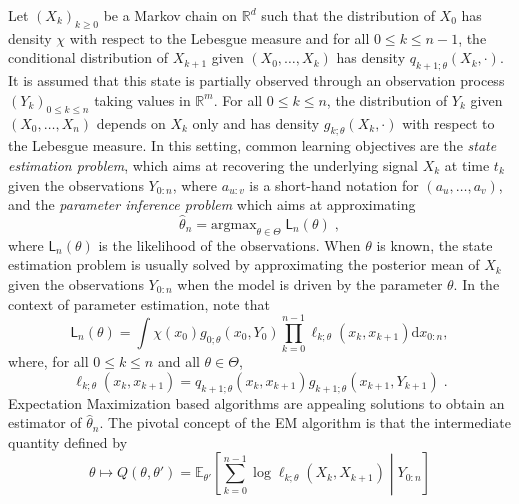 \documentclass{article}
\newcommand{\md}[1]{g_{#1}}
\newcommand{\llh}[1]{\mathsf{L}_{#1}}
\newcommand{\parvec}{\theta}
\newcommand{\parspace}{\Theta}
\newcommand{\hd}[1]{q_{#1}}
\def\pE{\mathbb{E}}
\newcommand{\rset}{\ensuremath{\mathbb{R}}}
\newcommand{\rmd}{\ensuremath{\mathrm{d}}}
\newcommand{\eqsp}{\;}
\newcommand{\qg}[1]{\ell_{#1}}
\newcommand{\sfd}{\mathsf{d}}
\begin{document}
%
Let $(X_k)_{k\geq 0}$ be a Markov chain on $\rset^d$ such that the distribution of $X_0$ has density $\chi$ with respect to the Lebesgue measure and for all $0\leqslant k \leqslant n-1$, the conditional distribution of $X_{k+1} $ given $(X_{0},\ldots, X_k)$ has density $\hd{k+1;\parvec}(X_{k},\cdot)$. 
It is assumed that this state  is partially observed  through an observation process $(Y_k)_{0\leqslant k \leqslant n}$ taking values in $\mathbb{R}^m$. 
For all $0\leqslant k \leqslant n$, the distribution of $Y_k$ given $(X_0,\ldots,X_n)$ depends on $X_k$ only and has density $\md{k;\parvec}(X_k,\cdot)$ with respect to the Lebesgue measure. In this setting, common learning objectives are the \textit{state estimation problem}, which aims at recovering the underlying signal $X_k$ at time $t_k$ given the observations $Y_{0:n}$, where $a_{u:v}$ is a short-hand notation for $(a_u,\ldots,a_v)$, and the \textit{parameter inference  problem} which aims at approximating 
$$
\widehat \parvec_n = \mathrm{argmax}_{\parvec\in\parspace}\eqsp\llh{n}(\parvec)\eqsp,
$$
where $\llh{n}(\parvec)$ is the likelihood of the observations. When $\parvec$ is known, the state estimation problem is usually solved by approximating the posterior mean of $X_k$ given the observations $Y_{0:n}$ when the model is driven by the parameter $\parvec$. In the context of parameter estimation, note that
$$
\llh{n}(\parvec)  = \int \chi(x_0)\md{0;\parvec}(x_{0},Y_{0})\prod_{k=0}^{n-1}\qg{k;\parvec}(x_{k},x_{k+1})\rmd x_{0:n},
$$
 where, for all $0\leqslant k \leqslant n$ and all $\parvec\in\parspace$,
\begin{equation*}
\qg{k;\parvec}(x_{k},x_{k+1}) = \hd{k+1;\parvec}(x_{k}, x_{k+1})\md{k+1;\parvec}(x_{k+1},Y_{k+1})\eqsp.
\end{equation*}
Expectation Maximization based algorithms are appealing solutions to obtain an estimator of $\hat \parvec_n$.
The pivotal concept of the EM algorithm is that the intermediate quantity defined by
\begin{equation}
\parvec\mapsto Q(\parvec,\parvec') = \pE_{\parvec'}\left[\sum_{k=0}^{n-1} \log \qg{k;\parvec}(X_{k},X_{k+1})\middle | Y_{0:n}\right] \label{eq:EM:E:step}
\end{equation}
\end{document}

